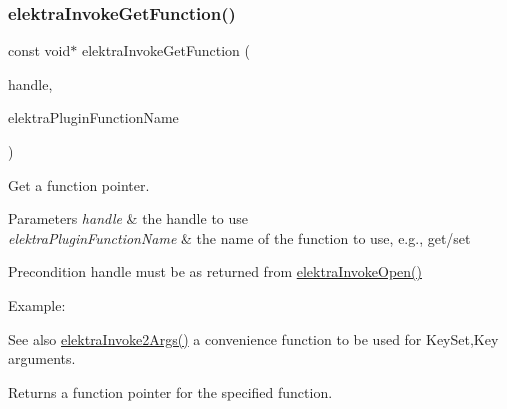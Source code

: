 \subsubsection{\texorpdfstring{elektraInvokeGetFunction()}{elektraInvokeGetFunction()}}
{\footnotesize\ttfamily const void$\ast$ elektra\+Invoke\+Get\+Function (\begin{DoxyParamCaption}\item[{Elektra\+Invoke\+Handle $\ast$}]{handle,  }\item[{const char $\ast$}]{elektra\+Plugin\+Function\+Name }\end{DoxyParamCaption})}



Get a function pointer. 


\begin{DoxyParams}{Parameters}
{\em handle} & the handle to use \\
\hline
{\em elektra\+Plugin\+Function\+Name} & the name of the function to use, e.\+g., get/set\\
\hline
\end{DoxyParams}
\begin{DoxyPrecond}{Precondition}
handle must be as returned from \mbox{\hyperlink{group__invoke_ga3eb20131e9a8fc9a6cebf126927c09bc}{elektra\+Invoke\+Open()}}
\end{DoxyPrecond}
Example\+:


\begin{DoxyCode}{0}
\end{DoxyCode}


\begin{DoxySeeAlso}{See also}
\mbox{\hyperlink{group__invoke_gaa257d93399c60f73c611205bbfa7c9a0}{elektra\+Invoke2\+Args()}} a convenience function to be used for Key\+Set,Key arguments.
\end{DoxySeeAlso}
\begin{DoxyReturn}{Returns}
a function pointer for the specified function. 
\end{DoxyReturn}
\mbox{\label{group__invoke_gaf3564011b52e96c9754a7b9bc41ea478}} 
